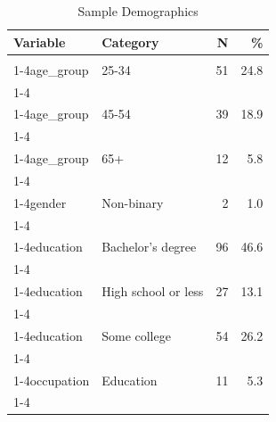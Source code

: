 \documentclass[
]{article}
\begin{document}
\begin{longtable}[t]{llrr}
\caption{\label{tab:tab-demographics}Sample Demographics}\\
\toprule
Variable & Category & N & \%\\
\midrule
\cellcolor{gray!10}{age\_group} & \cellcolor{gray!10}{18-24} & \cellcolor{gray!10}{18} & \cellcolor{gray!10}{8.7}\\
\cmidrule{1-4}\pagebreak[0]
age\_group & 25-34 & 51 & 24.8\\
\cmidrule{1-4}\pagebreak[0]
\cellcolor{gray!10}{age\_group} & \cellcolor{gray!10}{35-44} & \cellcolor{gray!10}{69} & \cellcolor{gray!10}{33.5}\\
\cmidrule{1-4}\pagebreak[0]
age\_group & 45-54 & 39 & 18.9\\
\cmidrule{1-4}\pagebreak[0]
\cellcolor{gray!10}{age\_group} & \cellcolor{gray!10}{55-64} & \cellcolor{gray!10}{17} & \cellcolor{gray!10}{8.3}\\
\cmidrule{1-4}\pagebreak[0]
age\_group & 65+ & 12 & 5.8\\
\cmidrule{1-4}\pagebreak[0]
\cellcolor{gray!10}{gender} & \cellcolor{gray!10}{Man} & \cellcolor{gray!10}{109} & \cellcolor{gray!10}{52.9}\\
\cmidrule{1-4}\pagebreak[0]
gender & Non-binary & 2 & 1.0\\
\cmidrule{1-4}\pagebreak[0]
\cellcolor{gray!10}{gender} & \cellcolor{gray!10}{Woman} & \cellcolor{gray!10}{95} & \cellcolor{gray!10}{46.1}\\
\cmidrule{1-4}\pagebreak[0]
education & Bachelor's degree & 96 & 46.6\\
\cmidrule{1-4}\pagebreak[0]
\cellcolor{gray!10}{education} & \cellcolor{gray!10}{Doctoral or professional degree} & \cellcolor{gray!10}{3} & \cellcolor{gray!10}{1.5}\\
\cmidrule{1-4}\pagebreak[0]
education & High school or less & 27 & 13.1\\
\cmidrule{1-4}\pagebreak[0]
\cellcolor{gray!10}{education} & \cellcolor{gray!10}{Master's degree} & \cellcolor{gray!10}{26} & \cellcolor{gray!10}{12.6}\\
\cmidrule{1-4}\pagebreak[0]
education & Some college & 54 & 26.2\\
\cmidrule{1-4}\pagebreak[0]
\cellcolor{gray!10}{occupation} & \cellcolor{gray!10}{Creative \& Design} & \cellcolor{gray!10}{12} & \cellcolor{gray!10}{5.8}\\
\cmidrule{1-4}\pagebreak[0]
occupation & Education & 11 & 5.3\\
\cmidrule{1-4}\pagebreak[0]

\end{longtable}
\end{document}
